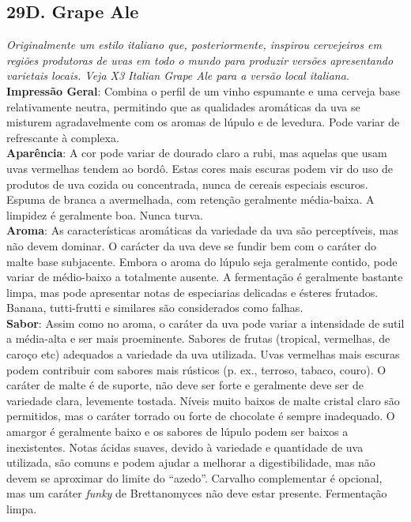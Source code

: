 \subsection*{29D. Grape Ale}
\textit{Originalmente um estilo italiano que, posteriormente, inspirou cervejeiros em regiões produtoras de uvas em todo o mundo para produzir versões apresentando varietais locais. Veja X3 Italian Grape Ale para a versão local italiana.}\\
\textbf{Impressão Geral}: Combina o perfil de um vinho espumante e uma cerveja base relativamente neutra, permitindo que as qualidades aromáticas da uva se misturem agradavelmente com os aromas de lúpulo e de levedura. Pode variar de refrescante à complexa. \\
\textbf{Aparência}: A cor pode variar de dourado claro a rubi, mas aquelas que usam uvas vermelhas tendem ao bordô. Estas cores mais escuras podem vir do uso de produtos de uva cozida ou concentrada, nunca de cereais especiais escuros. Espuma de branca a avermelhada, com retenção geralmente média-baixa. A limpidez é geralmente boa. Nunca turva. \\
\textbf{Aroma}: As características aromáticas da variedade da uva são perceptíveis, mas não devem dominar. O carácter da uva deve se fundir bem com o caráter do malte base subjacente. Embora o aroma do lúpulo seja geralmente contido, pode variar de médio-baixo a totalmente ausente. A fermentação é geralmente bastante limpa, mas pode apresentar notas de especiarias delicadas e ésteres frutados. Banana, tutti-frutti e similares são considerados como falhas. \\
\textbf{Sabor}: Assim como no aroma, o caráter da uva pode variar a intensidade de sutil a média-alta e ser mais proeminente. Sabores de frutas (tropical, vermelhas, de caroço etc) adequados a variedade da uva utilizada. Uvas vermelhas mais escuras podem contribuir com sabores mais rústicos (p. ex., terroso, tabaco, couro). O caráter de malte é de suporte, não deve ser forte e geralmente deve ser de variedade clara, levemente tostada. Níveis muito baixos de malte cristal claro são permitidos, mas o caráter torrado ou forte de chocolate é sempre inadequado. O amargor é geralmente baixo e os sabores de lúpulo podem ser baixos a inexistentes. Notas ácidas suaves, devido à variedade e quantidade de uva utilizada, são comuns e podem ajudar a melhorar a digestibilidade, mas não devem se aproximar do limite do “azedo”. Carvalho complementar é opcional, mas um caráter \textit{funky} de Brettanomyces não deve estar presente. Fermentação limpa. \\
